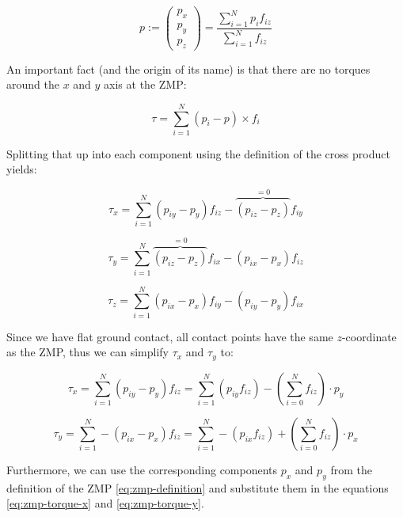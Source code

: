 \documentclass[english,ngerman]{KITreprt}
\begin{document}
\begin{equation} \label{eq:zmp-definition}
p := \left(\begin{array}{c}
p_x \\ p_y \\ p_z
\end{array}\right)
   = \frac{\sum^N_{i=1}p_i f_{iz}}{\sum^N_{i=1} f_{iz}}
\end{equation}

An important fact (and the origin of its name) is that there are no
torques around the $x$ and $y$ axis at the ZMP:

\begin{equation}
\tau = \sum^N_{i=1} (p_i - p) \times f_i
\end{equation}

Splitting that up into each component using the definition of the cross
product yields:

\begin{equation}
\tau_x = \sum^N_{i=1} (p_{iy} - p_y) f_{iz} - \overbrace{(p_{iz} - p_z)}^{=0} f_{iy}
\end{equation}

\begin{equation}
\tau_y = \sum^N_{i=1} \overbrace{(p_{iz} - p_z)}^{=0} f_{ix} - (p_{ix} - p_x) f_{iz}
\end{equation}

\begin{equation}
\tau_z = \sum^N_{i=1} (p_{ix} - p_x) f_{iy} - (p_{iy} - p_y) f_{ix}
\end{equation}

Since we have flat ground contact, all contact points have the same
$z$-coordinate as the ZMP, thus we can simplify $\tau_x$ and $\tau_y$
to:

\begin{equation} \label{eq:zmp-torque-x}
\tau_x = \sum^N_{i=1} (p_{iy} - p_y) f_{iz} = \sum^N_{i=1} (p_{iy} f_{iz}) - (\sum^N_{i=0} f_{iz}) \cdot p_y
\end{equation}

\begin{equation}\label{eq:zmp-torque-y}
\tau_y = \sum^N_{i=1} - (p_{ix} - p_x) f_{iz} = \sum^N_{i=1} - (p_{ix} f_{iz}) + (\sum^N_{i=0} f_{iz}) \cdot p_x
\end{equation}

Furthermore, we can use the corresponding components $p_x$ and $p_y$
from the definition of the ZMP \ref{eq:zmp-definition} and substitute
them in the equations \ref{eq:zmp-torque-x} and \ref{eq:zmp-torque-y}.
\end{document}
